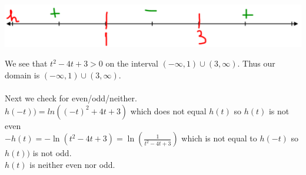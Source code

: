 \documentclass[nooutcomes, noinstructornotes]{ximera}
\begin{document}
\begin{problem}
\begin{enumerate}
\begin{freeResponse}
	\begin{image}		
	\includegraphics[scale=0.2]{Figure10.png}
	\end{image}
		We see that $t^2-4t+3>0$ on the interval $(-\infty,1) \cup (3,\infty)$.  Thus our domain is $(-\infty,1) \cup (3,\infty)$.\\ \\
		
		Next we check for even/odd/neither.\\
		$h(-t))=ln((-t)^2+4t+3)$ which does not equal $h(t)$ so $h(t)$ is not even\\
		$-h(t)=-\ln(t^2-4t+3)=\ln\left( \frac{1}{t^2-4t+3} \right)$ which is not equal to $h(-t)$ so $h(t))$ is not odd.\\
		$h(t)$ is neither even nor odd.


		\end{freeResponse}

\end{enumerate}

\end{problem}
\end{document}
